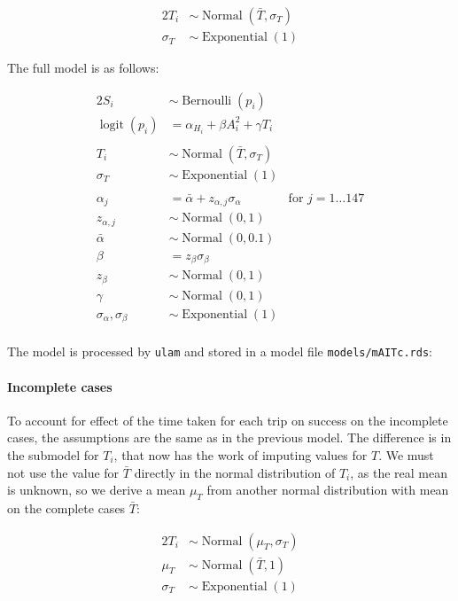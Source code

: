 \documentclass[article, a4paper, 12pt]{memoir}
\DeclareMathOperator{\logit}{logit}
\DeclareMathOperator{\normal}{Normal}
\DeclareMathOperator{\exponential}{Exponential}
\DeclareMathOperator{\bernoulli}{Bernoulli}
\begin{document}
\begin{alignat*}{2}
    T_i& \sim \normal(\bar{T}, \sigma_T)\\
    \sigma_T& \sim \exponential(1)
\end{alignat*}

The full model is as follows:

\begin{alignat*}{2}
    S_i& \sim \bernoulli(p_i)&\\
    \logit(p_i)& = \alpha_{H_i} + \beta A_i^2 + \gamma T_i\\
    \\
    T_i& \sim \normal(\bar{T}, \sigma_T)\\
    \sigma_T& \sim \exponential(1)&\\
    \\
    \alpha_j& = \bar{\alpha} + z_{\alpha,j}\sigma_\alpha{}& \text{for $j = 1 \dots 147$}\\
    z_{\alpha,j}& \sim \normal(0,1)&\\
    \bar{\alpha}& \sim \normal(0, 0.1)&\\
    \beta& = z_{\beta}\sigma_\beta&\\
    z_{\beta}& \sim \normal(0,1)&\\
    \gamma& \sim \normal(0,1)\\
    \sigma_\alpha, \sigma_\beta& \sim \exponential(1)&\\
\end{alignat*}

The model is processed by \texttt{ulam} and stored in a model file \texttt{models/mAITc.rds}:



\paragraph*{Incomplete cases}
To account for effect of the time taken for each trip on success on the incomplete cases, the assumptions are the same as in the previous model.
The difference is in the submodel for $T_i$, that now has the work of imputing values for $T$.
We must not use the value for $\bar{T}$ directly in the normal distribution of $T_i$, as the real mean is unknown, so we derive a mean $\mu_T$ from another normal distribution with mean on the complete cases $\bar{T}$:

\begin{alignat*}{2}
    T_i& \sim \normal(\mu_T, \sigma_T)\\
    \mu_T& \sim \normal(\bar{T}, 1)\\
    \sigma_T& \sim \exponential(1)
\end{alignat*}
\end{document}
